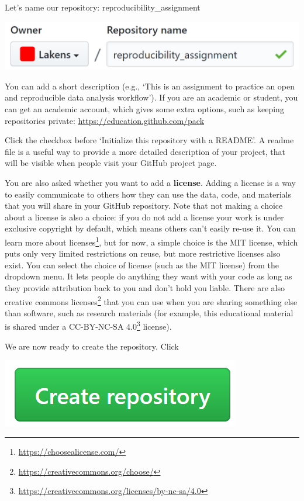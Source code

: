 \documentclass[
  oneside]{krantz}
\renewcommand{\href}[2]{#2\footnote{\url{#1}}}
\begin{document}
Let's name our repository: reproducibility\_assignment

\begin{center}\includegraphics[width=1\linewidth]{images/5cddb5d5a5ef1b470b5d160857a71719} \end{center}

You can add a short description (e.g., `This is an assignment to practice an
open and reproducible data analysis workflow'). If you are an academic or
student, you can get an academic account, which gives some extra options, such
as keeping repositories private: \url{https://education.github.com/pack}

Click the checkbox before `Initialize this repository with a README'. A readme
file is a useful way to provide a more detailed description of your project,
that will be visible when people visit your GitHub project page.

You are also asked whether you want to add a \textbf{license}. Adding a license is a way to easily communicate to others how they can use the data, code, and materials that you will share in your GitHub repository. Note that not making a choice about a license is also a choice: if you do not add a license your work is under exclusive copyright by default, which means others can't easily re-use it. You can \href{https://choosealicense.com/}{learn more about licenses}, but for now, a simple choice is the MIT license, which puts only very limited restrictions on reuse, but more restrictive licenses also exist. You can select the choice of license (such as the MIT license) from the dropdown menu. It lets people do anything they want with your code as long as they provide attribution back to you and don't hold you liable. There are also \href{https://creativecommons.org/choose/}{creative commons
licenses} that you can use when you are sharing something else than software, such as research materials (for example, this educational material is shared under a \href{https://creativecommons.org/licenses/by-nc-sa/4.0}{CC-BY-NC-SA 4.0} license).

We are now ready to create the repository. Click

\begin{center}\includegraphics[width=0.2\linewidth]{images/ccb66558822a17c4a3ec6511c9bf5a7b} \end{center}
\end{document}
